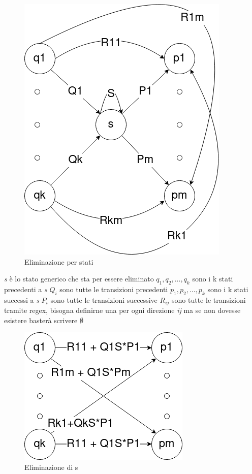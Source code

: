 \documentclass[12pt]{article}
\begin{document}
	\newpage

	\begin{figure}[h]
		\includegraphics[scale = 0.5]{media/regex_dfa.png}
		\centering
		\caption{Eliminazione per stati}
	\end{figure}

	\begin{outline}
		\1 \emph{s} è lo stato generico che sta per essere eliminato
		\1 $q_1, q_2,...,q_k$ sono i k stati precedenti a \emph{s}
		\1 $Q_i$ sono tutte le transizioni precedenti
		\1 $p_1, p_2,...,p_k$ sono i k stati successi a \emph{s}
		\1 $P_i$ sono tutte le transizioni successive
		\1 $R_{ij}$ sono tutte le transizioni tramite regex, bisogna definirne una per ogni direzione \emph{ij} ma se non dovesse esistere basterà scrivere $\emptyset$
	\end{outline}

	\begin{figure}[ht]
		\includegraphics[scale = 0.5]{media/removed_s.png}
		\centering
		\caption{Eliminazione di s}
	\end{figure}
\end{document}
